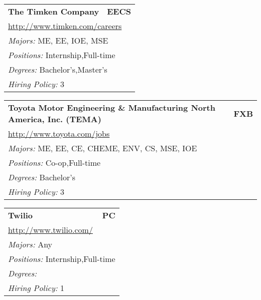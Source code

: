 \documentclass[twoside]{article}
\begin{document}
\begin{center}
\begin{multicols}{3}
\begin{FlushLeft}
\begin{minipage}{\columnwidth}
\end{minipage}
 
\begin{minipage}{\columnwidth}\begin{tabularx}{.95\columnwidth}{Xr}
                 {\Large\bf The Timken Company} & {\Large\bf EECS}\\
    \multicolumn{2}{p{.95\columnwidth}}{\url{http://www.timken.com/careers}}\\
    \multicolumn{2}{p{.95\columnwidth}}{\emph{Majors:} ME, EE, IOE, MSE}\\
    \multicolumn{2}{p{.95\columnwidth}}{\emph{Positions:} Internship,Full-time}\\
    \multicolumn{2}{p{.95\columnwidth}}{\emph{Degrees:} Bachelor's,Master's}\\
    \multicolumn{2}{p{.95\columnwidth}}{\emph{Hiring Policy:} 3}\\
    \end{tabularx}
    
\end{minipage}
 
\begin{minipage}{\columnwidth}\begin{tabularx}{.95\columnwidth}{Xr}
                 {\Large\bf Toyota Motor Engineering \& Manufacturing North America, Inc. (TEMA)} & {\Large\bf FXB}\\
    \multicolumn{2}{p{.95\columnwidth}}{\url{http://www.toyota.com/jobs}}\\
    \multicolumn{2}{p{.95\columnwidth}}{\emph{Majors:} ME, EE, CE, CHEME, ENV, CS, MSE, IOE}\\
    \multicolumn{2}{p{.95\columnwidth}}{\emph{Positions:} Co-op,Full-time}\\
    \multicolumn{2}{p{.95\columnwidth}}{\emph{Degrees:} Bachelor's}\\
    \multicolumn{2}{p{.95\columnwidth}}{\emph{Hiring Policy:} 3}\\
    \end{tabularx}
    
\end{minipage}
 
\begin{minipage}{\columnwidth}\begin{tabularx}{.95\columnwidth}{Xr}
                 {\Large\bf Twilio} & {\Large\bf PC}\\
    \multicolumn{2}{p{.95\columnwidth}}{\url{http://www.twilio.com/}}\\
    \multicolumn{2}{p{.95\columnwidth}}{\emph{Majors:} Any}\\
    \multicolumn{2}{p{.95\columnwidth}}{\emph{Positions:} Internship,Full-time}\\
    \multicolumn{2}{p{.95\columnwidth}}{\emph{Degrees:} }\\
    \multicolumn{2}{p{.95\columnwidth}}{\emph{Hiring Policy:} 1}\\
    \end{tabularx}
    

\end{minipage}
\end{FlushLeft}
\end{multicols}
\end{center}
\end{document}
